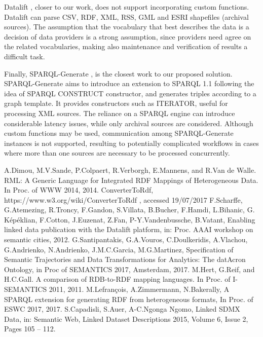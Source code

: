 \documentclass{sig-alternate}
\begin{document}
Datalift  \cite{_Ref490495848}, closer to our work, does not support incorporating custom functions. Datalift can parse CSV, RDF, XML, RSS, GML and ESRI shapefiles (archival sources). The assumption that the vocabulary that best describes the data is a decision of data providers is a strong assumption, since providers need agree on the related vocabularies, making also maintenance and verification of results a difficult task. 

Finally, SPARQL-Generate  \cite{_Ref490495859}, is the closest work to our proposed solution. SPARQL-Generate aims to introduce an extension to SPARQL 1.1 following the idea of SPARQL CONSTRUCT constructor, and generates triples according to a graph template. It provides constructors such as ITERATOR, useful for processing XML sources. The reliance on a SPARQL engine can introduce considerable latency issues, while only archival sources are considered. Although custom functions may be used, communication among SPARQL-Generate instances is not supported, resulting to potentially complicated workflows in cases where more than one sources are necessary to be processed concurrently.

\begin{thebibliography}{4}

 A.Dimou, M.V.Sande, P.Colpaert, R.Verborgh, E.Mannens, and R.Van de Walle. RML: A Generic Language for Integrated RDF Mappings of Heterogeneous Data. In Proc. of WWW 2014, 2014.
 ConverterToRdf, https://www.w3.org/wiki/ConverterToRdf , accessed 19/07/2017
 F.Scharffe, G.Atemezing, R.Troncy, F.Gandon, S.Villata, B.Bucher, F.Hamdi, L.Bihanic, G. K\'ep\'eklian, F.Cotton, J.Euzenat, Z.Fan, P-Y.Vandenbussche, B.Vatant, Enabling linked data publication with the Datalift platform, in: Proc. AAAI workshop on semantic cities, 2012.
 G.Santipantakis, G.A.Vouros,  C.Doulkeridis, A.Vlachou, G.Andrienko, N.Andrienko, J.M.C.Garcia, M.G.Martinez, Specification of Semantic Trajectories and Data Transformations for Analytics: The datAcron Ontology, in Proc of SEMANTICS 2017, Amsterdam, 2017.
 M.Hert, G.Reif, and H.C.Gall. A comparison of RDB-to-RDF mapping languages. In Proc. of I-SEMANTICS 2011, 2011.
 M.Lefrançois, A.Zimmermann, N.Bakerally, A SPARQL extension for generating RDF from heterogeneous formats, In Proc. of  ESWC 2017, 2017.
 S.Capadisli, S.Auer, A-C.Ngonga Ngomo, Linked SDMX Data, in: Semantic Web, Linked Dataset Descriptions 2015, Volume 6, Issue 2, Pages 105 -- 112.

\end{thebibliography}
\end{document}
